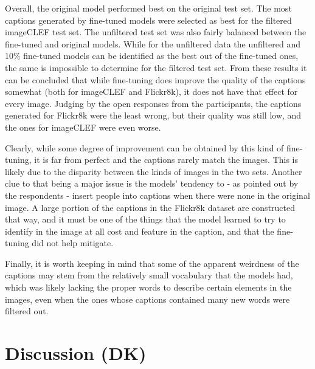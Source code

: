 \documentclass[11pt]{article}
\begin{document}
Overall, the original model performed best on the original test set. The most captions generated by fine-tuned models were selected as best for the filtered imageCLEF test set. The unfiltered test set was also fairly balanced between the fine-tuned and original models. While for the unfiltered data the unfiltered and 10\% fine-tuned models can be identified as the best out of the fine-tuned ones, the same is impossible to determine for the filtered test set. From these results it can be concluded that while fine-tuning does improve the quality of the captions somewhat (both for imageCLEF and Flickr8k), it does not have that effect for every image. Judging by the open responses from the participants, the captions generated for Flickr8k were the least wrong, but their quality was still low, and the ones for imageCLEF were even worse.

Clearly, while some degree of improvement can be obtained by this kind of fine-tuning, it is far from perfect and the captions rarely match the images. This is likely due to the disparity between the kinds of images in the two sets. Another clue to that being a major issue is the models' tendency to - as pointed out by the respondents - insert people into captions when there were none in the original image. A large portion of the captions in the Flickr8k dataset are constructed that way, and it must be one of the things that the model learned to try to identify in the image at all cost and feature in the caption, and that the fine-tuning did not help mitigate.

Finally, it is worth keeping in mind that some of the apparent weirdness of the captions may stem from the relatively small vocabulary that the models had, which was likely lacking the proper words to describe certain elements in the images, even when the ones whose captions contained many new words were filtered out.

\section{Discussion (DK)}
\end{document}
